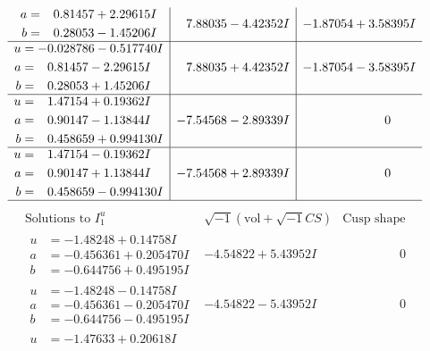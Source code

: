 \documentclass[1p]{elsarticle_modified}
\theoremstyle{definition}
\newcommand{\I}{\sqrt{-1}}
\begin{document}
$$\begin{array}{c|c|c}
\begin{aligned}
a &= \phantom{-}0.81457 + 2.29615 I \\
b &= \phantom{-}0.28053 - 1.45206 I\end{aligned}
 & \phantom{-}7.88035 - 4.42352 I & -1.87054 + 3.58395 I \\ \hline\begin{aligned}
u &= -0.028786 - 0.517740 I \\
a &= \phantom{-}0.81457 - 2.29615 I \\
b &= \phantom{-}0.28053 + 1.45206 I\end{aligned}
 & \phantom{-}7.88035 + 4.42352 I & -1.87054 - 3.58395 I \\ \hline\begin{aligned}
u &= \phantom{-}1.47154 + 0.19362 I \\
a &= \phantom{-}0.90147 - 1.13844 I \\
b &= \phantom{-}0.458659 + 0.994130 I\end{aligned}
 & -7.54568 - 2.89339 I & \phantom{-0.000000 } 0 \\ \hline\begin{aligned}
u &= \phantom{-}1.47154 - 0.19362 I \\
a &= \phantom{-}0.90147 + 1.13844 I \\
b &= \phantom{-}0.458659 - 0.994130 I\end{aligned}
 & -7.54568 + 2.89339 I & \phantom{-0.000000 } 0\\
 \hline 
 \end{array}$$\newpage$$\begin{array}{c|c|c}  
\text{Solutions to }I^u_{1}& \I (\text{vol} + \sqrt{-1}CS) & \text{Cusp shape}\\
 \hline 
\begin{aligned}
u &= -1.48248 + 0.14758 I \\
a &= -0.456361 + 0.205470 I \\
b &= -0.644756 + 0.495195 I\end{aligned}
 & -4.54822 + 5.43952 I & \phantom{-0.000000 } 0 \\ \hline\begin{aligned}
u &= -1.48248 - 0.14758 I \\
a &= -0.456361 - 0.205470 I \\
b &= -0.644756 - 0.495195 I\end{aligned}
 & -4.54822 - 5.43952 I & \phantom{-0.000000 } 0 \\ \hline\begin{aligned}
u &= -1.47633 + 0.20618 I \\

\end{aligned}
\end{array}$$
\end{document}
